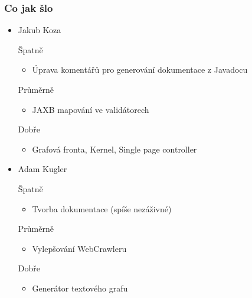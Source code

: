 \documentclass{beamer}
\begin{document}
\begin{frame}[allowframebreaks]\frametitle{Co jak šlo}
  \begin{itemize}
    \item Jakub Koza
     \begin{block}{Špatně} %
       \begin{itemize}
        \item Úprava komentářů pro generování dokumentace z Javadocu
       \end{itemize}
     \end{block}
     \begin{block}{Průměrně} %
        \begin{itemize}
        \item JAXB mapování ve validátorech
       \end{itemize}
     \end{block}
     \begin{block}{Dobře} %
       \begin{itemize}
        \item Grafová fronta, Kernel, Single page controller
       \end{itemize}
     \end{block}
   
    \item Adam Kugler
      \begin{block}{Špatně} %
       \begin{itemize}
        \item Tvorba dokumentace (spíše nezáživné)
       \end{itemize}
     \end{block}
     \begin{block}{Průměrně} %
        \begin{itemize}
        \item Vylepšování WebCrawleru
       \end{itemize}
     \end{block}
     \begin{block}{Dobře} %
       \begin{itemize}
        \item Generátor textového grafu
       \end{itemize}
     \end{block}
  

\end{itemize}
\end{frame}
\end{document}
